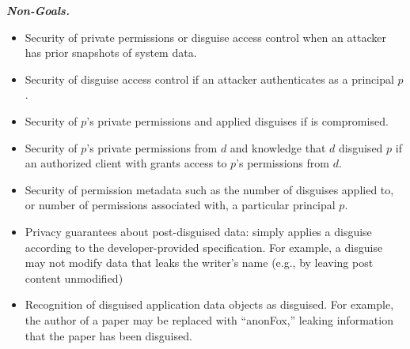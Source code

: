 \vspace{6pt}\noindent\textbf{\emph{Non-Goals.}}
\begin{itemize}
    \item Security of private permissions or disguise access control when an attacker has prior snapshots of system data.
    \item Security of disguise access control if an attacker authenticates as a principal $p$.
    \item Security of $p$'s private permissions and applied disguises if  is compromised.  
    \item Security of $p$'s private permissions from $d$ and knowledge that $d$ disguised $p$ if an
        authorized client with  grants \sys access to $p$'s permissions from $d$. 
    \item Security of permission metadata such as the number of disguises applied to, or number of
        permissions associated with, a particular principal $p$.
    \item Privacy guarantees about post-disguised data: \sys simply
        applies a disguise according to the developer-provided specification.  For example, a
        disguise may not modify data that leaks the writer's name (e.g., by leaving post content
        unmodified)
    \item Recognition of disguised application data objects as disguised. For example, the author of a
        paper may be replaced with ``anonFox,'' leaking information that the paper has been
        disguised.
\end{itemize}




